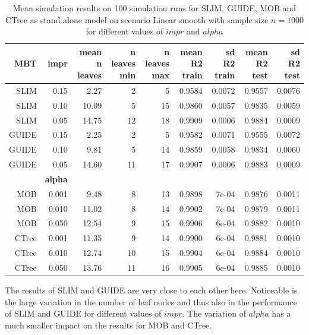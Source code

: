 \begin{table} 
\caption{Mean simulation results on 100 simulation runs for SLIM, GUIDE, MOB and CTree as stand alone model on scenario Linear smooth with sample size $n = 1000$ for different values of $impr$ and $alpha$}
\centering \tiny
\begin{tabular}[t]{r|r|r|r|r|r|r|r|r}
\hline
MBT & \textbf{impr} & mean n leaves & n leaves min & n leaves max & mean R2 train & sd R2 train & mean R2 test & sd R2 test\\
\hline
SLIM & 0.15 & 2.27 & 2 & 5 & 0.9584 & 0.0072 & 0.9557 & 0.0076\\
SLIM & 0.10 & 10.09 & 5 & 15 & 0.9860 & 0.0057 & 0.9835 & 0.0059\\
SLIM & 0.05 & 14.75 & 12 & 18 & 0.9909 & 0.0006 & 0.9884 & 0.0009\\
GUIDE & 0.15 & 2.25 & 2 & 5 & 0.9582 & 0.0071 & 0.9555 & 0.0072\\
GUIDE & 0.10 & 9.81 & 5 & 14 & 0.9859 & 0.0058 & 0.9834 & 0.0060\\
GUIDE & 0.05 & 14.60 & 11 & 17 & 0.9907 & 0.0006 & 0.9883 & 0.0009\\
\hline
 & \textbf{alpha} &  &  &  &  &  &  & \\
\hline
MOB & 0.001 & 9.48 & 8 & 13 & 0.9898 & 7e-04 & 0.9876 & 0.0011\\
MOB & 0.010 & 11.02 & 8 & 14 & 0.9902 & 7e-04 & 0.9879 & 0.0011\\
MOB & 0.050 & 12.54 & 9 & 15 & 0.9906 & 6e-04 & 0.9882 & 0.0010\\
CTree & 0.001 & 11.35 & 9 & 14 & 0.9900 & 6e-04 & 0.9881 & 0.0010\\
CTree & 0.010 & 12.74 & 10 & 15 & 0.9904 & 6e-04 & 0.9884 & 0.0010\\
CTree & 0.050 & 13.76 & 11 & 16 & 0.9905 & 6e-04 & 0.9885 & 0.0010\\
\hline
\end{tabular}
\label{tab:linear_smooth_summary}
\end{table}
The results of SLIM and GUIDE are very close to each other here. Noticeable is the large variation in the number of leaf nodes and thus also in the performance of SLIM and GUIDE for different values of $impr$. The variation of $alpha$ has a much smaller impact on the results for MOB and CTree.

